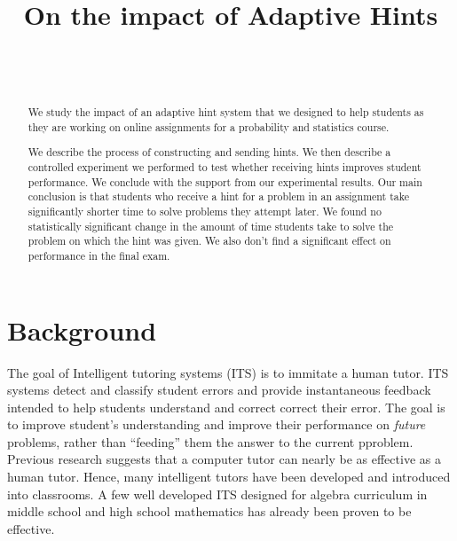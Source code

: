 \documentclass{sigchi}
\title{On the impact of Adaptive Hints}
\author{
  \alignauthor{Zhen Zhai\\
    \affaddr{UC San Diego}\\
    \email{zzhai@eng.ucsd.edu}}\\
  \alignauthor{Yoav Freund\\
    \affaddr{UC San Diego}\\
    \email{yfreund@eng.ucsd.edu}}\\
}
\begin{document}
\maketitle

\begin{abstract}

We study the impact of an adaptive hint system that we designed to help students as they are working on online assignments for a probability and statistics course.

We describe the process of constructing and sending hints. We then describe a controlled experiment we performed to test whether receiving hints improves student performance. We conclude with the support from our experimental results. Our main conclusion is that students who receive a hint for a problem in an assignment take significantly shorter time to solve problems they attempt later. We found no statistically significant change in the amount of time students take to solve the problem on which the hint was given. We also don't find a significant effect on performance in the final exam.

\end{abstract}

\section*{Background}
The goal of Intelligent tutoring systems (ITS)\cite{Anderson1995} is
to immitate a human tutor.  ITS systems detect and classify student
errors and provide instantaneous feedback intended to help students
understand and correct correct their error. The goal is to improve
student's understanding and improve their performance on {\em future}
problems, rather than ``feeding'' them the answer to the current
pproblem.  Previous research suggests that a computer tutor can nearly
be as effective as a human tutor\cite{Vanlehn2011}. Hence, many
intelligent tutors have been developed and introduced into
classrooms. A few well developed ITS designed for algebra curriculum
in middle school and high school mathematics has already been proven
to be effective\cite{Koedinger1997,John2014}.
\end{document}
